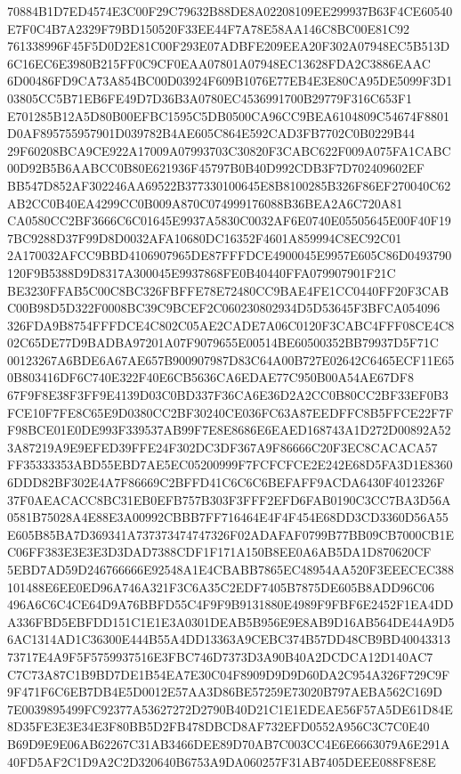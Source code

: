 \documentclass[UTF8,fontset=fandol,zihao=-4,a4paper]{ctexart}
\begin{document}
{{70884B1D7ED4574E3C00F29C79632B88DE8A02208109EE299937B63F4CE60540E7F0C4B7A2329F79BD150520F33EE44F7A78E58AA146C8BC00E81C92
761338996F45F5D0D2E81C00F293E07ADBFE209EEA20F302A07948EC5B513D6C16EC6E3980B215FF0C9CF0EAA07801A07948EC13628FDA2C3886EAAC
6D00486FD9CA73A854BC00D03924F609B1076E77EB4E3E80CA95DE5099F3D103805CC5B71EB6FE49D7D36B3A0780EC4536991700B29779F316C653F1
E701285B12A5D80B00EFBC1595C5DB0500CA96CC9BEA6104809C54674F8801D0AF895755957901D039782B4AE605C864E592CAD3FB7702C0B0229B44
29F60208BCA9CE922A17009A07993703C30820F3CABC622F009A075FA1CABC00D92B5B6AABCC0B80E621936F45797B0B40D992CDB3F7D702409602EF
BB547D852AF302246AA69522B377330100645E8B8100285B326F86EF270040C62AB2CC0B40EA4299CC0B009A870C074999176088B36BEA2A6C720A81
CA0580CC2BF3666C6C01645E9937A5830C0032AF6E0740E05505645E00F40F197BC9288D37F99D8D0032AFA10680DC16352F4601A859994C8EC92C01
2A170032AFCC9BBD4106907965DE87FFFDCE4900045E9957E605C86D0493790120F9B5388D9D8317A300045E9937868FE0B40440FFA079907901F21C
BE3230FFAB5C00C8BC326FBFFE78E72480CC9BAE4FE1CC0440FF20F3CABC00B98D5D322F0008BC39C9BCEF2C060230802934D5D53645F3BFCA054096
326FDA9B8754FFFDCE4C802C05AE2CADE7A06C0120F3CABC4FFF08CE4C802C65DE77D9BADBA97201A07F9079655E00514BE60500352BB79937D5F71C
00123267A6BDE6A67AE657B900907987D83C64A00B727E02642C6465ECF11E650B803416DF6C740E322F40E6CB5636CA6EDAE77C950B00A54AE67DF8
67F9F8E38F3FF9E4139D03C0BD337F36CA6E36D2A2CC0B80CC2BF33EF0B3FCE10F7FE8C65E9D0380CC2BF30240CE036FC63A87EEDFFC8B5FFCE22F7F
F98BCE01E0DE993F339537AB99F7E8E8686E6EAED168743A1D272D00892A523A87219A9E9EFED39FFE24F302DC3DF367A9F86666C20F3EC8CACACA57
FF35333353ABD55EBD7AE5EC05200999F7FCFCFCE2E242E68D5FA3D1E83606DDD82BF302E4A7F86669C2BFFD41C6C6C6BEFAFF9ACDA6430F4012326F
37F0AEACACC8BC31EB0EFB757B303F3FFF2EFD6FAB0190C3CC7BA3D56A0581B75028A4E88E3A00992CBBB7FF716464E4F4F454E68DD3CD3360D56A55
E605B85BA7D369341A737373474747326F02ADAFAF0799B77BB09CB7000CB1EC06FF383E3E3E3D3DAD7388CDF1F171A150B8EE0A6AB5DA1D870620CF
5EBD7AD59D246766666E92548A1E4CBABB7865EC48954AA520F3EEECEC388101488E6EE0ED96A746A321F3C6A35C2EDF7405B7875DE605B8ADD96C06
496A6C6C4CE64D9A76BBFD55C4F9F9B9131880E4989F9FBF6E2452F1EA4DDA336FBD5EBFDD151C1E1E3A0301DEAB5B956E9E8AB9D16AB564DE44A9D5
6AC1314AD1C36300E444B55A4DD13363A9CEBC374B57DD48CB9BD4004331373717E4A9F5F5759937516E3FBC746D7373D3A90B40A2DCDCA12D140AC7
C7C73A87C1B9BD7DE1B54EA7E30C04F8909D9D9D60DA2C954A326F729C9F9F471F6C6EB7DB4E5D0012E57AA3D86BE57259E73020B797AEBA562C169D
7E0039895499FC92377A53627272D2790B40D21C1E1EDEAE56F57A5DE61D84E8D35FE3E3E34E3F80BB5D2FB478DBCD8AF732EFD0552A956C3C7C0E40
B69D9E9E06AB62267C31AB3466DEE89D70AB7C003CC4E6E6663079A6E291A40FD5AF2C1D9A2C2D320640B6753A9DA060257F31AB7405DEEE088F8E8E
}}
\end{document}
